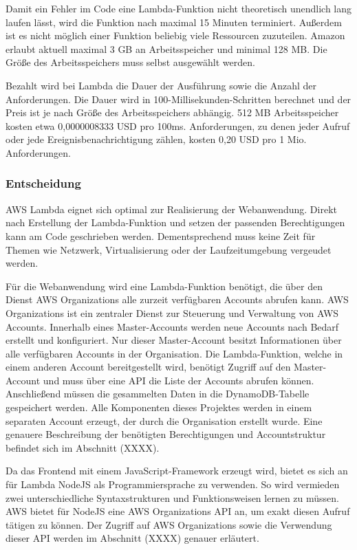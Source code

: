 {Damit ein Fehler im Code eine Lambda-Funktion nicht theoretisch unendlich lang laufen lässt, wird die Funktion nach maximal 15 Minuten terminiert.
Außerdem ist es nicht möglich einer Funktion beliebig viele Ressourcen zuzuteilen.
Amazon erlaubt aktuell maximal 3 GB an Arbeitsspeicher und minimal 128 MB.
Die Größe des Arbeitsspeichers muss selbst ausgewählt werden.

Bezahlt wird bei Lambda die Dauer der Ausführung sowie die Anzahl der Anforderungen.
Die Dauer wird in 100-Millisekunden-Schritten berechnet und der Preis ist je nach Größe des Arbeitsspeichers abhängig.
512 MB Arbeitsspeicher kosten etwa 0,0000008333 USD pro 100ms.
Anforderungen, zu denen jeder Aufruf oder jede Ereignisbenachrichtigung zählen, kosten 0,20 USD pro 1 Mio. Anforderungen.\cite[]{LambdaPreise}

\subsubsection{Entscheidung}
\label{LambdaEntscheidung}
AWS Lambda eignet sich optimal zur Realisierung der Webanwendung.
Direkt nach Erstellung der Lambda-Funktion und setzen der passenden Berechtigungen kann am Code geschrieben werden.
Dementsprechend muss keine Zeit für Themen wie Netzwerk, Virtualisierung oder der Laufzeitumgebung vergeudet werden.

Für die Webanwendung wird eine Lambda-Funktion benötigt, die über den Dienst AWS Organizations alle zurzeit verfügbaren Accounts abrufen kann.
AWS Organizations ist ein zentraler Dienst zur Steuerung und Verwaltung von AWS Accounts.
Innerhalb eines Master-Accounts werden neue Accounts nach Bedarf erstellt und konfiguriert.
Nur dieser Master-Account besitzt Informationen über alle verfügbaren Accounts in der Organisation.
Die Lambda-Funktion, welche in einem anderen Account bereitgestellt wird, benötigt Zugriff auf den Master-Account und muss über eine API die Liste der Accounts abrufen können.
Anschließend müssen die gesammelten Daten in die DynamoDB-Tabelle gespeichert werden.
Alle Komponenten dieses Projektes werden in einem separaten Account erzeugt, der durch die Organisation erstellt wurde.
Eine genauere Beschreibung der benötigten Berechtigungen und Accountstruktur befindet sich im Abschnitt (XXXX).

Da das Frontend mit einem JavaScript-Framework erzeugt wird, bietet es sich an für Lambda NodeJS als Programmiersprache zu verwenden.
So wird vermieden zwei unterschiedliche Syntaxstrukturen und Funktionsweisen lernen zu müssen.
AWS bietet für NodeJS eine AWS Organizations API an, um exakt diesen Aufruf tätigen zu können.
Der Zugriff auf AWS Organizations sowie die Verwendung dieser API werden im Abschnitt (XXXX) genauer erläutert.
\cite[]{SDKListAccounts}

}
